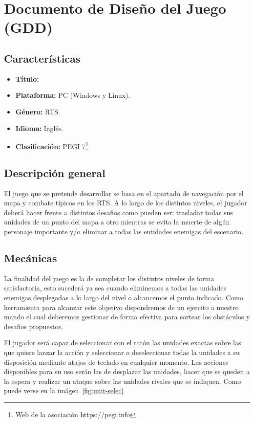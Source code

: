\chapter{Documento de Diseño del Juego (GDD)}
\label{GDD}
\section{Características}
\begin{itemize}
	\item \textbf{Título:} 
	\item \textbf{Plataforma:} \ac{PC} (Windows y Linux).
	\item \textbf{Género:} \acf{RTS}.
	\item \textbf{Idioma:} Inglés.
	\item \textbf{Clasificación:} PEGI 7\footnote{Web de la asociación https://pegi.info}
\end{itemize}

\section{Descripción general}
El juego que se pretende desarrollar se basa en el apartado de navegación por el mapa y combate
típicos en los \ac{RTS}. A lo largo de los distintos niveles, el jugador deberá hacer
frente a distintos desafios como pueden ser: trasladar todas sus unidades de un punto
del mapa a otro mientras se evita la muerte de algún personaje importante y/o eliminar
a todas las entidades enemigas del escenario.

\section{Mecánicas}
La finalidad del juego es la de completar los distintos niveles de forma satisfactoria,
esto sucederá ya sea cuando eliminemos a todas las unidades enemigas desplegadas a lo
largo del nivel o alcancemos el punto indicado. Como herramienta para alcanzar este
objetivo dispondremos de un ejercito a nuestro mando el cual deberemos gestionar de
forma efectiva para sortear los obstáculos y desafios propuestos.

El jugador será capaz de seleccionar con el ratón las unidades exactas sobre las que
quiere lanzar la acción y seleccionar o deseleccionar todas la unidades a su
disposición mediante atajos de teclado en cualquier momento. Las acciones disponibles
para su uso serán las de desplazar las unidades, hacer que se queden a la espera y
realizar un ataque sobre las unidades rivales que se indiquen. Como puede verse en la
imágen~\ref{fig:unit-selec}

